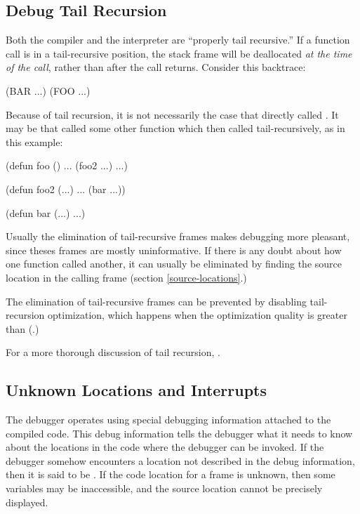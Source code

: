 \subsection{Debug Tail Recursion}
\label{debug-tail-recursion}

Both the compiler and the interpreter are ``properly tail recursive.''  If a
function call is in a tail-recursive position, the stack frame will be
deallocated {\em at the time of the call}, rather than after the call returns.
Consider this backtrace:
\begin{example}
(BAR ...) 
(FOO ...)
\end{example}
Because of tail recursion, it is not necessarily the case that
 directly called .  It may be that  called
some other function  which then called 
tail-recursively, as in this example:
\begin{example}
(defun foo ()
  ...
  (foo2 ...)
  ...)

(defun foo2 (...)
  ...
  (bar ...))

(defun bar (...)
  ...)
\end{example}

Usually the elimination of tail-recursive frames makes debugging more
pleasant, since theses frames are mostly uninformative.  If there is any
doubt about how one function called another, it can usually be
eliminated by finding the source location in the calling frame (section
\ref{source-locations}.)

The elimination of tail-recursive frames can be prevented by disabling
tail-recursion optimization, which happens when the 
optimization quality is greater than 
(.)

For a more thorough discussion of tail recursion, .


\subsection{Unknown Locations and Interrupts}
\label{unknown-locations}

The debugger operates using special debugging information attached to
the compiled code.  This debug information tells the debugger what it
needs to know about the locations in the code where the debugger can be
invoked.  If the debugger somehow encounters a location not described in
the debug information, then it is said to be .  If the code
location for a frame is unknown, then some variables may be
inaccessible, and the source location cannot be precisely displayed.

